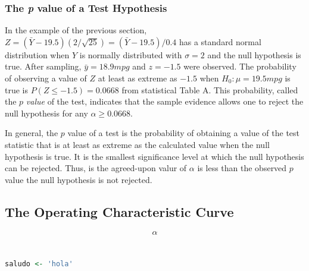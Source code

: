 \documentclass{WileySev}
\begin{document}
\subsection{The \textit{p} value of a Test Hypothesis}

In the example of the previous section, $Z = (\bar{Y}-19.5)(2/\sqrt{25}) = (\bar{Y}-19.5)/0.4$ has a standard normal distribution when $Y$ is normally distributed with $\sigma = 2$ and the null hypothesis is true. After sampling, $\bar{y}=18.9 mpg$ and $z=-1.5$ were observed. The probability of observing a value of $Z$ at least as extreme as $-1.5$ when $H_0:\mu=19.5 mpg$ is true is $P(Z\leq-1.5)=0.0668$ from statistical Table A. This probability, called the $p$ \textit{value} of the test, indicates that the sample evidence allows one to reject the null hypothesis for any $\alpha\geq 0.0668$.

In general, the $p$ value of a test is the probability of obtaining a value of the test statistic that is at least as extreme as the calculated value when the null hypothesis is true. It is the smallest significance level at which the null hypothesis can be rejected. Thus, is the agreed-upon valur of $\alpha$ is less than the observed $p$ value the null hypothesis is not rejected.

\section{The Operating Characteristic Curve}

\begin{equation}
\alpha
\end{equation}

\chapter[Single-Factor Experiment]{}

\begin{lstlisting}[language=R]
saludo <- 'hola'
\end{lstlisting}






\end{document}

